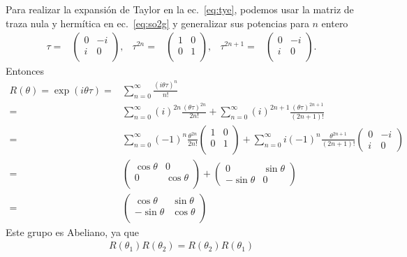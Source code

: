 \begin{frame}
Para realizar la expansión de Taylor en la ec.~\eqref{eq:tye}, podemos usar la matriz de traza nula y hermítica en ec.~\eqref{eq:so2g} y generalizar sus potencias para $n$ entero
\begin{align*}
  \tau=&
  \begin{pmatrix}
   0 &-i\\ %
   i &0\\  %
  \end{pmatrix},&\tau^{2n}=&  \begin{pmatrix}
   1 &0\\
   0 &1\\ 
  \end{pmatrix},&\tau^{2n+1}=&  \begin{pmatrix}
   0 &-i\\
   i &0\\ 
  \end{pmatrix}.
\end{align*}
Entonces
\begin{align}
\label{eq:so2}
  R(\theta)=\exp \left( i \theta\tau \right)=&\sum_{n=0}^{\infty}\frac{\left(i \theta\tau \right)^{n}}{n!}\nonumber\\
=&\sum_{n=0}^{\infty}(i)^{2n}\frac{\left( \theta\tau \right)^{2n}}{2n!}+\sum_{n=0}^{\infty}(i)^{2n+1}\frac{\left( \theta\tau \right)^{2n+1}}{(2n+1)!}\nonumber\\
  =&\sum_{n=0}^{\infty}(-1)^{n}\frac{\theta^{2n}}{2n!}
  \begin{pmatrix}
    1 & 0\\
    0 & 1\\
  \end{pmatrix}
+\sum_{n=0}^{\infty}i(-1)^{n}\frac{ \theta^{2n+1}}{(2n+1)!}
\begin{pmatrix}
  0 & -i \\
  i & 0
\end{pmatrix}
\nonumber\\
    =&
  \begin{pmatrix}
    \cos\theta & 0\\
    0 & \cos\theta \\
  \end{pmatrix}
+
\begin{pmatrix}
  0 & \sin\theta \\
  -\sin\theta & 0
\end{pmatrix}
\nonumber\\
    =&
  \begin{pmatrix}
    \cos\theta & \sin\theta\\
     -\sin\theta& \cos\theta \\
  \end{pmatrix}
\end{align}
Este grupo es Abeliano, ya que
\begin{align}
  R(\theta_1)R(\theta_2)=R(\theta_2)R(\theta_1)
\end{align}
\end{frame}

